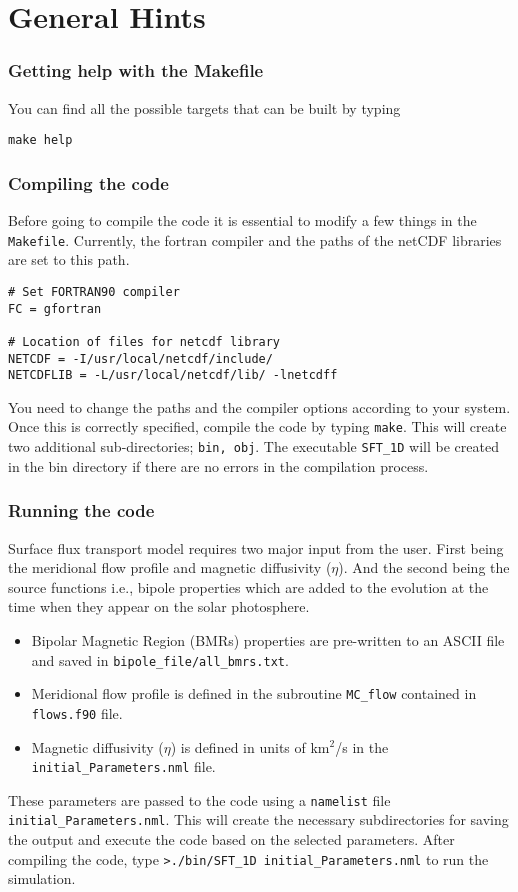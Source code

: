 \section{General Hints}

\subsubsection{Getting help with the Makefile}

You can find all the possible
targets  that can be built by typing
\begin{verbatim}
make help
\end{verbatim}

\subsubsection{Compiling the code}
Before going to compile the code it is essential to modify a few things in the \texttt{Makefile}.
Currently, the fortran compiler and the paths of the netCDF libraries are set to this path.
\begin{verbatim}
# Set FORTRAN90 compiler
FC = gfortran

# Location of files for netcdf library
NETCDF = -I/usr/local/netcdf/include/
NETCDFLIB = -L/usr/local/netcdf/lib/ -lnetcdff
\end{verbatim}
You need to change the paths and the compiler options according to your system. Once this is correctly specified, compile the code by typing \texttt{make}. This will create two additional sub-directories; \texttt{bin, obj}. The executable \texttt{SFT\_1D} will be created in the bin directory if there are no errors in the compilation process.

\subsubsection{Running the code}
Surface flux transport model requires two major input from the user. First being the meridional flow profile and magnetic diffusivity ($\eta$). And the second being the source functions i.e., bipole properties which are added to the evolution at the time when they appear on the solar photosphere. 
\begin{itemize}
    \item Bipolar Magnetic Region (BMRs) properties are pre-written to an ASCII file and saved in \texttt{bipole\_file/all\_bmrs.txt}.
    \item Meridional flow profile is defined in the subroutine \texttt{MC\_flow} contained in \texttt{flows.f90} file. 
    \item Magnetic diffusivity ($\eta$) is defined in units of km$^2$/s in the \texttt{initial\_Parameters.nml} file.
\end{itemize}
These parameters are passed to the code using a \texttt{namelist} file \texttt{initial\_Parameters.nml}. This will create the necessary subdirectories for saving the output and execute the code based on the selected parameters. After compiling the code, type \texttt{>./bin/SFT\_1D initial\_Parameters.nml} to run the simulation.

